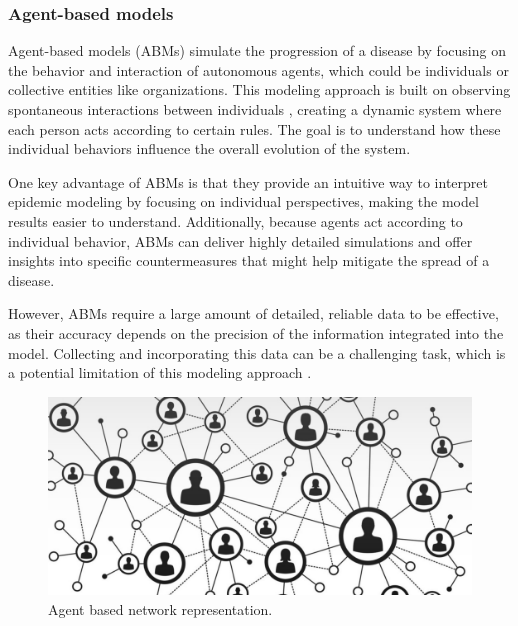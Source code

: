 \subsubsection{Agent-based models}
Agent-based models (ABMs) simulate the progression of a disease by focusing on the behavior and interaction of autonomous agents, which could be individuals or collective entities like organizations. This modeling approach is built on observing spontaneous interactions between individuals \cite{Tizzoni2014}, creating a dynamic system where each person acts according to certain rules. The goal is to understand how these individual behaviors influence the overall evolution of the system.

One key advantage of ABMs is that they provide an intuitive way to interpret epidemic modeling by focusing on individual perspectives, making the model results easier to understand. Additionally, because agents act according to individual behavior, ABMs can deliver highly detailed simulations and offer insights into specific countermeasures that might help mitigate the spread of a disease.

However, ABMs require a large amount of detailed, reliable data to be effective, as their accuracy depends on the precision of the information integrated into the model. Collecting and incorporating this data can be a challenging task, which is a potential limitation of this modeling approach \cite{Hernandez_Vargas_2022}.
\begin{figure}
	\centering
	\includegraphics[width=0.5\linewidth]{0_introduction/images_introduction/agent_based}
	\caption[Agent based network representation]{Agent based network representation.}
	\label{fig:agentbased}
\end{figure}

